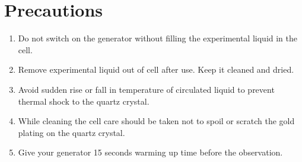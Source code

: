 \chapter{Precautions}%
\begin{enumerate}

\item Do not switch on the generator without filling the experimental liquid in
the cell.
 \item Remove experimental liquid out of cell after use. Keep it cleaned and
dried.
 \item Avoid sudden rise or fall in temperature of circulated liquid to prevent
thermal shock to the quartz crystal.
 \item While cleaning the cell care should be taken not to spoil or scratch the
gold plating on the quartz crystal.
 \item Give your generator 15 seconds warming up time before the observation.
\end{enumerate}